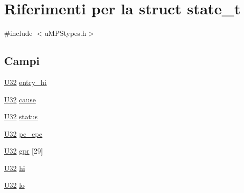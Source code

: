 \hypertarget{structstate__t}{\section{Riferimenti per la struct state\-\_\-t}
\label{structstate__t}
}


{\ttfamily \#include $<$u\-M\-P\-Stypes.\-h$>$}

\subsection*{Campi}
\begin{DoxyCompactItemize}
\item 
\hyperlink{base_8h_ac3df7cf3c8cb172a588adec881447d68}{U32} \hyperlink{structstate__t_a867e8a3789b0868e6fe3cb734b8d7e34}{entry\-\_\-hi}
\item 
\hyperlink{base_8h_ac3df7cf3c8cb172a588adec881447d68}{U32} \hyperlink{structstate__t_a977139f16407ef0c648e940dabe05318}{cause}
\item 
\hyperlink{base_8h_ac3df7cf3c8cb172a588adec881447d68}{U32} \hyperlink{structstate__t_ae37efb991e613c0dc476ece5ed4ffa71}{status}
\item 
\hyperlink{base_8h_ac3df7cf3c8cb172a588adec881447d68}{U32} \hyperlink{structstate__t_ac0cfee10c7a13bb3749604cd15892217}{pc\-\_\-epc}
\item 
\hyperlink{base_8h_ac3df7cf3c8cb172a588adec881447d68}{U32} \hyperlink{structstate__t_aff9aa91408afefa93942d0e288b73c96}{gpr} \mbox{[}29\mbox{]}
\item 
\hyperlink{base_8h_ac3df7cf3c8cb172a588adec881447d68}{U32} \hyperlink{structstate__t_a0e34aeb4eba44f3971bb1bf383435897}{hi}
\item 
\hyperlink{base_8h_ac3df7cf3c8cb172a588adec881447d68}{U32} \hyperlink{structstate__t_a55f6b3c956fb70c8ef13c4a00ccd3a7b}{lo}
\end{DoxyCompactItemize}



